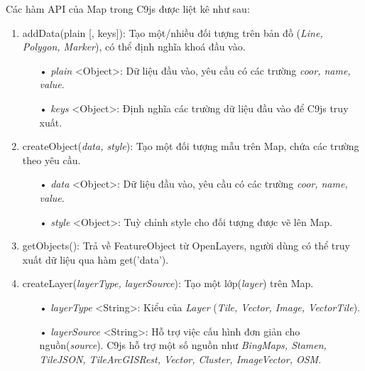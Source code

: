 \documentclass[12pt,a4paper,twoside]{article}
\begin{document}
Các hàm API của Map trong C9js được liệt kê như sau:
\begin{enumerate}
\item \textsf{addData(plain [, keys])}: Tạo một/nhiều đối tượng trên bản đồ (\textit{Line, Polygon, Marker}), có thể định nghĩa khoá đầu vào.
	\begin{itemize}
		\item[•] \textit{plain} <Object>: Dữ liệu đầu vào, yêu cầu có các trường \textit{coor, name, value}.
		\item[•] \textit{keys} <Object>: Định nghĩa các trường dữ liệu đầu vào để C9js truy xuất.
	\end{itemize}
	
\item \textsf{createObject(\textit{data, style})}: Tạo một đối tượng mẫu trên Map, chứa các trường theo yêu cầu.
	\begin{itemize}
		\item[•] \textit{data} <Object>: Dữ liệu đầu vào, yêu cầu có các trường \textit{coor, name, value}.
		\item[•] \textit{style} <Object>: Tuỳ chỉnh style cho đối tượng được vẽ lên Map.
	\end{itemize}
	
\item \textsf{getObjects()}: Trả về FeatureObject từ OpenLayers, người dùng có thể truy xuất dữ liệu qua hàm \textsf{get('data')}.

\item \textsf{createLayer(\textit{layerType, layerSource})}: Tạo một lớp(\textit{layer}) trên Map.
	\begin{itemize}
		\item[•] \textit{layerType} <String>: Kiểu của \textit{Layer} (\textit{Tile, Vector, Image, VectorTile}).
		\item[•] \textit{layerSource} <String>: Hỗ trợ việc cấu hình đơn giản cho nguồn(\textit{source}). C9js hỗ trợ một số nguồn như \textit{BingMaps, Stamen, TileJSON, TileArcGISRest, Vector, Cluster, ImageVector, OSM}.
	\end{itemize}


\end{enumerate}
\end{document}
